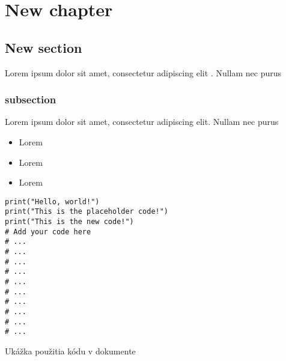 \chapter{New chapter}

    \section{New section}
        Lorem ipsum dolor sit amet, consectetur adipiscing elit \cite{example_citation}. Nullam nec purus

        \subsection{subsection}
            Lorem ipsum dolor sit amet, consectetur adipiscing elit. Nullam nec purus
            \begin{itemize}
                \item Lorem
                \item Lorem
                \item Lorem
            \end{itemize}

        \begin{listing}[!ht]
            \begin{verbatim}
print("Hello, world!")
print("This is the placeholder code!")
print("This is the new code!")
# Add your code here
# ...
# ...
# ...
# ...
# ...
# ...
# ...
# ...
# ...
# ...
            \end{verbatim}
            \caption{Ukážka použitia kódu v dokumente}
        \end{listing}
